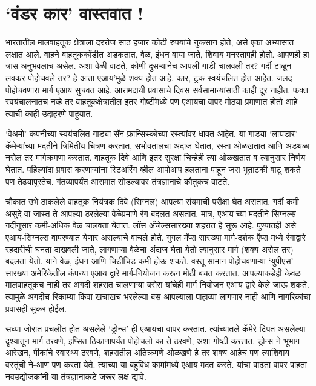 \chapter{`वंडर कार' वास्तवात !}

भारतातील मालवाहतूक क्षेत्राला दररोज साठ हजार कोटी रुपयांचे नुकसान होते, असे एका अभ्यासात लक्षात आले. वाहने वाहतूककोंडीत अडकतात, वेळ, इंधन वाया जाते, शिवाय मनस्तापही होतो. आपणही हा त्रास अनुभवलाच असेल. अशा वेळी वाटते, कोणी दुसऱ्यानेच आपली गाडी चालवली तर? गर्दी टाळून लवकर पोहोचवले तर? हे आता एआय'मुळे शक्य होत आहे. कार, ट्रक स्वयंचलित होत आहेत. जलद पोहोचवणारा मार्ग एआय सुचवत आहे. आरामदायी प्रवासाचे दिवस सर्वसामान्यांसाठी काही दूर नाहीत. फक्त स्वयंचालनातच नव्हे तर वाहतूकक्षेत्रातील इतर गोष्टींमध्ये पण एआयचा वापर मोठ्या प्रमाणात होतो आहे त्याची काही उदाहरणे पाहुयात.

`वेअमो' कंपनीच्या स्वयंचलित गाड्या सॅन फ्रान्सिस्कोच्या रस्त्यांवर धावत आहेत. या गाड्या `लायडार' कॅमेर्‍यांच्या मदतीने त्रिमितीय चित्रण करतात, सभोवतालचा अंदाज घेतात, रस्ता ओळखतात आणि अडथळा नसेल तर मार्गक्रमणा करतात. वाहतूक दिवे आणि इतर सुरक्षा चिन्हेही त्या ओळखतात व त्यानुसार निर्णय घेतात. पहिल्यांदा प्रवास करणाऱ्यांना स्टिअरिंग व्हील आपोआप हलताना पाहून जरा भुताटकी वाटू शकते पण तेढ्यापुरतेच. गंतव्यापर्यंत आरामात सोडल्यावर तंत्रज्ञानाचे कौतुकच वाटते.

चौकात उभे ठाकलेले वाहतूक नियंत्रक दिवे (सिग्नल) आपल्या संयमाची परीक्षा घेत असतात. गर्दी कमी असुदे वा जास्त ते आपल्या ठरलेल्या वेळेप्रमाणे रंग बदलत असतात. मात्र, एआय'च्या मदतीने सिग्नल्स गर्दीनुसार कमी-अधिक वेळ चालवता येतात. लॉस अँजेल्ससारख्या शहरात हे सुरू आहे. पुण्यातही असे एआय-सिग्नल्स वापरण्यात येणार असल्याचे वाचले होते. गुगल मॅप्स सारख्या मार्ग-दर्शक ऍप्स मध्ये रंगाद्वारे रहदारीची घनता दाखवली जाते, लागणाऱ्या वेळेचा अंदाज घेता येतो त्यानुसार मार्ग (शक्य असेल तर) बदलता येतो. याने वेळ, इंधन आणि चिडीचिड कमी होऊ शकते. वस्तू-सामान पोहोचवणाऱ्या `युपीएस' सारख्या अमेरिकेतील कंपन्या एआय द्वारे मार्ग-नियोजन करून मोठी बचत करतात. आपल्याकडेही केवळ मालवाहतूकच नाही तर अगदी शहरात चालणाऱ्या बसेस यांचेही मार्ग नियोजन एआय द्वारे केले जाऊ शकते. त्यामुळे अगदीच रिकाम्या किंवा खचाखच भरलेल्या बस आपल्याला पाहाव्या लागणार नाही आणि नागरिकांचा प्रवासही सुकर होईल.

सध्या जोरात प्रचलीत होत असलेले `ड्रोन्स' ही एआयचा वापर करतात. त्यांच्यातले कॅमेरे टिपत असलेल्या दृश्यातून मार्ग-ठरवणे, इप्सित ठिकाणापर्यंत पोहोचलो का ते ठरवणे, अशा गोष्टी करतात. ड्रोन्स ने भूभाग आरेखन, पीकांचे स्वास्थ्य ठरवणे, शहरातील अतिक्रमणे ओळखणे हे तर शक्य आहेच पण त्याशिवाय वस्तूंची ने-आण पण करता येते. त्याच्या या बहुविध कामांमध्ये एआय मदत करते. यांचा वाढता वापर पाहता नवउद्योजकांनी या तंत्रज्ञानाकडे जरूर लक्ष द्यावे.

